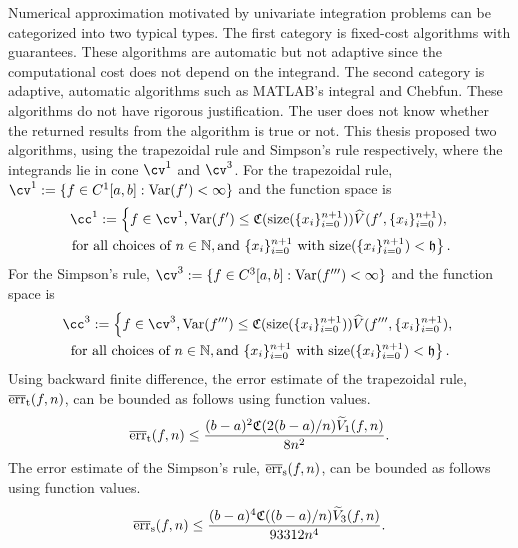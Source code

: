 \documentclass{iitthesis}
\DeclareMathOperator{\Var}{Var}
\theoremstyle{definition}
\theoremstyle{remark}
\begin{document}
Numerical approximation motivated by univariate integration problems can be categorized into two typical types. The first category is fixed-cost algorithms with guarantees. These algorithms are automatic but not adaptive since the computational cost does not depend on the integrand. The second category is adaptive, automatic algorithms such as MATLAB's integral and Chebfun. These algorithms do not have rigorous justification. The user does not know whether the returned results from the algorithm is true or not. This thesis proposed two algorithms, using the trapezoidal rule and Simpson's rule respectively, where the integrands lie in cone $\cv^1$ and $\cv^3$. For the trapezoidal rule, $\cv^{1}:=\{f\in C^{1}[a,b]: \Var(f') < \infty \}$ and the function space is
\begin{multline*}
\cc^{1}:=\left\{f\in \cv^{1}, \Var(f')\leq \mathfrak{C}(\text{size}(\{x_i\}_{i=0}^{n+1}))\widehat{V}(f',\{x_i\}_{i=0}^{n+1}),\right.\\ \left.\text{for all choices of } n\in \mathbb{N}, \text{and }\{x_i\}_{i=0}^{n+1} \text{ with }\text{size}(\{x_i\}_{i=0}^{n+1})<\mathfrak{h}\right\}.
\end{multline*}
 For the Simpson's rule, $\cv^{3}:=\{f\in C^{3}[a,b]: \Var(f''') < \infty \}$ and the function space is
 \begin{multline*}
\cc^{3}:=\left\{f\in \cv^{3}, \Var(f''')\leq \mathfrak{C}(\text{size}(\{x_i\}_{i=0}^{n+1}))\widehat{V}(f''',\{x_i\}_{i=0}^{n+1}),\right.\\ \left.\text{for all choices of } n\in \mathbb{N}, \text{and }\{x_i\}_{i=0}^{n+1} \text{ with }\text{size}(\{x_i\}_{i=0}^{n+1})<\mathfrak{h}\right\}.
\end{multline*}
  Using backward finite difference, the error estimate of the trapezoidal rule, $\overline{\textup{err}}_{\textup{t}}(f,n)$, can be bounded as follows using function values.
 \begin{equation*}
   \overline{\textup{err}}_{\textup{t}}(f,n)\leq \frac{(b-a)^2\mathfrak{C}(2(b-a)/n)\widetilde{V}_1(f,n)}{8n^2}.
 \end{equation*}
The error estimate of the Simpson's rule, $\overline{\textup{err}}_{\textup{s}}(f,n)$, can be bounded as follows using function values.
\begin{equation*}
  \overline{\textup{err}}_{\text{s}}(f,n)\leq \frac{(b-a)^4\mathfrak{C}((b-a)/n)\widetilde{V}_3(f,n)}{93312n^4}.
\end{equation*}
\end{document}
